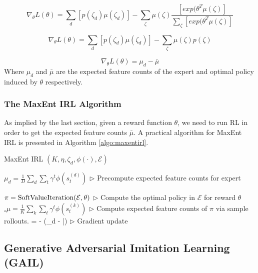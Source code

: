 \documentclass[11pt]{article}
\begin{document}
\begin{equation}
    \nabla_\theta L(\theta) = \sum_d [p(\zeta_d) \mu(\zeta_d)] - \sum_\zeta \mu(\zeta) \frac{[exp(\theta^T \mu(\zeta)]}{\sum_\zeta [exp(\theta^T \mu(\zeta)]} 
\end{equation}

\begin{equation}
    \nabla_\theta L(\theta) = \sum_d [p(\zeta_d) \mu(\zeta_d)] - \sum_\zeta \mu(\zeta) p(\zeta) 
\end{equation}

\begin{equation}
    \nabla_\theta L(\theta) = \mu_d - \bar{\mu}
\end{equation}
Where $\mu_d$ and $\bar{\mu}$ are the expected feature counts of the expert and optimal policy induced by $\theta$ respectively.

\subsubsection{The MaxEnt IRL Algorithm}
As implied by the last section, given a reward function $\theta$, we need to run RL in order to get the expected feature counts $\bar{\mu}$. A practical algorithm for MaxEnt IRL is presented in Algorithm \ref{algo:maxentirl}.

\begin{algorithm}[H]
\caption{MaxEnt IRL $(K, \eta, \zeta_d, \phi(\cdot), \mathcal{E})$}
\label{algo:maxentirl}
\begin{algorithmic}[1]

\State $\mu_d = \frac{1}{D} \sum_d \sum_t \gamma^t \phi(s^{(d)}_t)$ \hfill $\triangleright$ Precompute expected feature counts for expert

    \State $\pi = \hbox{SoftValueIteration}(\mathcal{E}, \theta)$ \hfill $\triangleright$ Compute the optimal policy in $\mathcal{E}$ for reward $\theta$
    \State $\bar_\mu = \frac{1}{K} \sum_k \sum_t \gamma^t \phi(s^{(k)}_t)$ \hfill $\triangleright$ Compute expected feature counts of $\pi$ via sample rollouts.
    \State \theta = \theta - \eta (\mu_d - \bar{\mu}) \hfill $\triangleright$ Gradient update
\EndFor

\end{algorithmic}
\end{algorithm}

\subsection{Generative Adversarial Imitation Learning (GAIL)}
\label{sec:gail}
\end{document}

